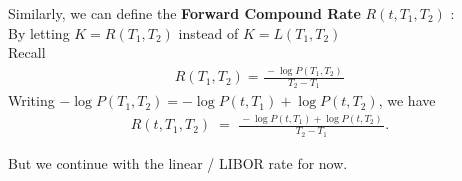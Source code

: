     \begin{definition}
    Similarly, we can define the \textbf{Forward Compound Rate} $ R(t, T_1, T_2) $ :\\
    By letting $ K = R(T_1, T_2) $ instead of $ K = L(T_1, T_2) $\\
    Recall
    \begin{align*}
        R(T_1, T_2) = \frac{\,-\log P(T_1, T_2)\,}{\,T_2 - T_1\,}
    \end{align*}
    Writing $ -\log P(T_1, T_2) = -\log P(t, T_1) + \log P(t, T_2) $, we have
    \begin{align}
        R(t, T_1, T_2) \;=\; \frac{\,-\log P(t, T_1) + \log P(t, T_2)\,}{\,T_2 - T_1\,}.
    \label{eq:forward_compound_rate}
    \end{align}
    \end{definition}
    But we continue with the linear / LIBOR rate for now.

